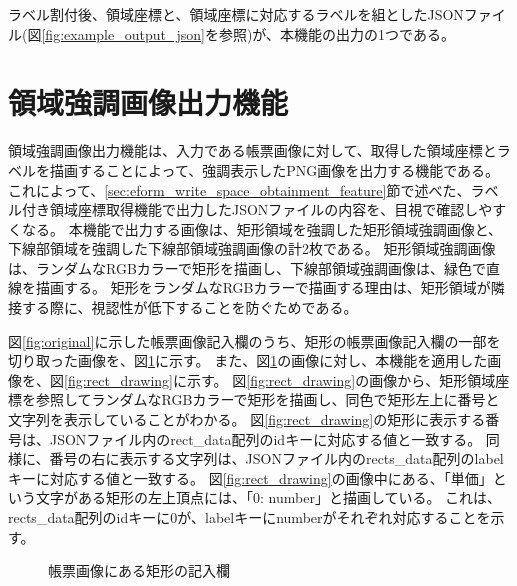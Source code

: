 ラベル割付後、領域座標と、領域座標に対応するラベルを組としたJSONファイル(図\ref{fig:example_output_json}を参照)が、本機能の出力の1つである。


\section{領域強調画像出力機能}\label{sec:highlighted_area_image_output}
領域強調画像出力機能は、入力である帳票画像に対して、取得した領域座標とラベルを描画することによって、強調表示したPNG画像を出力する機能である。
これによって、\ref{sec:eform_write_space_obtainment_feature}節で述べた、ラベル付き領域座標取得機能で出力したJSONファイルの内容を、目視で確認しやすくなる。
本機能で出力する画像は、矩形領域を強調した矩形領域強調画像と、下線部領域を強調した下線部領域強調画像の計2枚である。
矩形領域強調画像は、ランダムなRGBカラーで矩形を描画し、下線部領域強調画像は、緑色で直線を描画する。
矩形をランダムなRGBカラーで描画する理由は、矩形領域が隣接する際に、視認性が低下することを防ぐためである。

図\ref{fig:original}に示した帳票画像記入欄のうち、矩形の帳票画像記入欄の一部を切り取った画像を、図\ref{fig:rect_original}に示す。
また、図\ref{fig:rect_original}の画像に対し、本機能を適用した画像を、図\ref{fig:rect_drawing}に示す。
図\ref{fig:rect_drawing}の画像から、矩形領域座標を参照してランダムなRGBカラーで矩形を描画し、同色で矩形左上に番号と文字列を表示していることがわかる。
図\ref{fig:rect_drawing}の矩形に表示する番号は、JSONファイル内のrect\_data配列のidキーに対応する値と一致する。
同様に、番号の右に表示する文字列は、JSONファイル内のrects\_data配列のlabelキーに対応する値と一致する。
図\ref{fig:rect_drawing}の画像中にある、「単価」という文字がある矩形の左上頂点には、「0: number」と描画している。
これは、rects\_data配列のidキーに0が、labelキーにnumberがそれぞれ対応することを示す。

\begin{figure}[t]
    \begin{center}
        \caption{帳票画像にある矩形の記入欄}
        \label{fig:rect_original}
    \end{center}
\end{figure}

